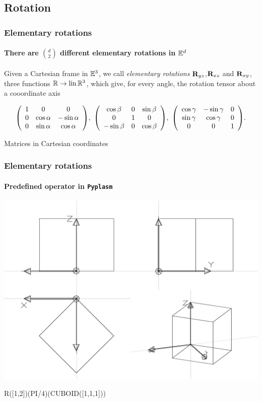 \documentclass{beamer}
\begin{document}
\subsection{Rotation}
\begin{frame}\frametitle{Elementary rotations}\small
\framesubtitle{There are ${d}\choose{2}$ different elementary rotations in $\mathbb{E}^d$}

\vfill

Given a Cartesian frame in $\mathbb{E}^{3}$, we call  \emph{elementary rotations} ${\bf R}_{yz}$,${\bf R}_{xz}$ and ${\bf R}_{xy}$, three functions $\mathbb{R}\rightarrow\mbox{\rm lin}\, \mathbb{R}^{3}$, which give, for every angle, the rotation tensor about a cooordinate axis

\vfill

\[
{\left(\begin{array}{cccccccccccccccccccccccccccc}
1 & 0 & 0 \\
0 & \cos\alpha & -\sin\alpha \\
0 & \sin\alpha & \cos\alpha 
\end{array}\right)},\
{\left(\begin{array}{cccccccccccccccccccccccccccc}
\cos\beta & 0 & \sin\beta \\
0 & 1 & 0 \\
-\sin\beta & 0 & \cos\beta 
\end{array}\right)},\
{\left(\begin{array}{cccccccccccccccccccccccccccc}
\cos\gamma & -\sin\gamma & 0 \\
\sin\gamma & \cos\gamma & 0 \\
0 & 0 & 1 
\end{array}\right)}.
\]
\vfill\centering

Matrices in Cartesian coordinates 

\end{frame}
\begin{frame}[fragile]
\frametitle{Elementary rotations}
\framesubtitle{Predefined operator in \texttt{Pyplasm}}


\vfill

\centering\includegraphics[width=0.6\linewidth]{figs/cube-r}


\vfill

\begin{python}
  R([1,2])(PI/4)(CUBOID([1,1,1]))
\end{python}


\end{frame}
\end{document}
